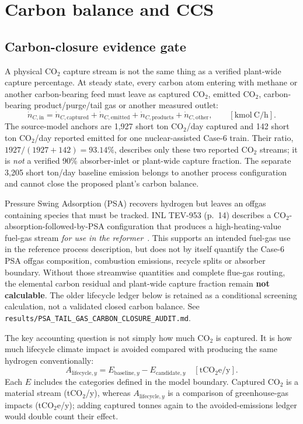 \section{Carbon balance and CCS}\label{sec:carbon}
\subsection{Carbon-closure evidence gate}
A physical CO$_2$ capture stream is not the same thing as a verified plant-wide capture percentage. At steady state, every carbon atom entering with methane or another carbon-bearing feed must leave as captured CO$_2$, emitted CO$_2$, carbon-bearing product/purge/tail gas or another measured outlet:
\[
\dot n_{C,\mathrm{in}}=\dot n_{C,\mathrm{captured}}+
\dot n_{C,\mathrm{emitted}}+\dot n_{C,\mathrm{products}}+
\dot n_{C,\mathrm{other}},\qquad
[\mathrm{kmol\ C/h}].
\]
The source-model anchors are 1,927 short ton CO$_2$/day captured and 142 short ton CO$_2$/day reported emitted for one nuclear-assisted Case-6 train. Their ratio, $1927/(1927+142)=93.14\%$, describes only these two reported CO$_2$ streams; it is \emph{not} a verified 90\% absorber-inlet or plant-wide capture fraction. The separate 3,205 short ton/day baseline emission belongs to another process configuration and cannot close the proposed plant's carbon balance.

Pressure Swing Adsorption (PSA) recovers hydrogen but leaves an offgas containing species that must be tracked. INL TEV-953 (p.~14) describes a CO$_2$-absorption-followed-by-PSA configuration that produces a high-heating-value fuel-gas stream \emph{for use in the reformer}~\cite{inltev953}. This supports an intended fuel-gas use in the reference process description, but does not by itself quantify the Case-6 PSA offgas composition, combustion emissions, recycle splits or absorber boundary. Without those streamwise quantities and complete flue-gas routing, the elemental carbon residual and plant-wide capture fraction remain \textbf{not calculable}. The older lifecycle ledger below is retained as a conditional screening calculation, not a validated closed carbon balance. See \texttt{results/PSA\_TAIL\_GAS\_CARBON\_CLOSURE\_AUDIT.md}.

The key accounting question is not simply how much CO$_2$ is captured. It is how much lifecycle climate impact is avoided compared with producing the same hydrogen conventionally:
\[
A_{\mathrm{lifecycle},y}
=E_{\mathrm{baseline},y}-E_{\mathrm{candidate},y}
\quad[\mathrm{tCO_2e/y}].
\]
Each $E$ includes the categories defined in the model boundary. Captured CO$_2$ is a material stream (tCO$_2$/y), whereas $A_{\mathrm{lifecycle},y}$ is a comparison of greenhouse-gas impacts (tCO$_2$e/y); adding captured tonnes again to the avoided-emissions ledger would double count their effect.

